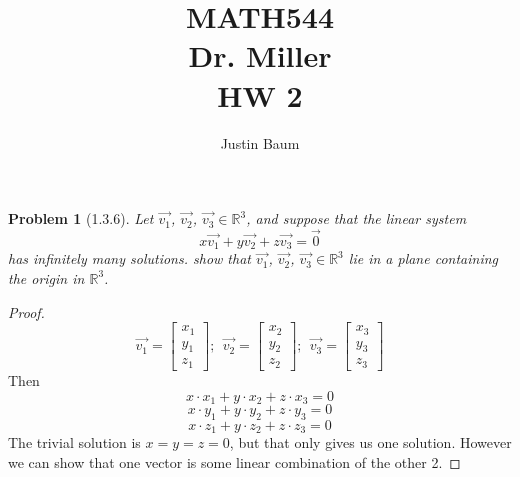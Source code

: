 \documentclass[12pt]{article}   %
\title{MATH544 \\ Dr. Miller \\ HW 2}
\author{Justin Baum}
\newcommand{\R}{\mathbb{R}} %
\newtheorem{theorem}{Problem}
\begin{document}
\maketitle
\begin{theorem}[1.3.6]
Let $\Vec{v_1}$, $\Vec{v_2}$, $\Vec{v_3} \in \R^3$, and suppose that the linear system
\[x\Vec{v_1}+y\Vec{v_2}+z\Vec{v_3}=\Vec{0}\]
has infinitely many solutions. show that $\Vec{v_1}$, $\Vec{v_2}$, $\Vec{v_3} \in \R^3$ lie in a  plane containing the origin in $\R^3$.
\end{theorem}
\begin{proof}
\[\Vec{v_1}=\begin{bmatrix}x_1\\y_1\\z_1\end{bmatrix};\ \ 
\Vec{v_2}=\begin{bmatrix}x_2\\y_2\\z_2\end{bmatrix};\ \ \Vec{v_3}=\begin{bmatrix}x_3\\y_3\\z_3\end{bmatrix} \]
Then
\[x\cdot x_1+y\cdot x_2+z\cdot x_3=0\]
\[x\cdot y_1+y\cdot y_2+z\cdot y_3=0\]
\[x\cdot z_1+y\cdot z_2+z\cdot z_3=0\]
The trivial solution is $x=y=z=0$, but that only gives us one solution. However we can show that one vector is some linear combination of the other 2.


\end{proof}
\end{document}
